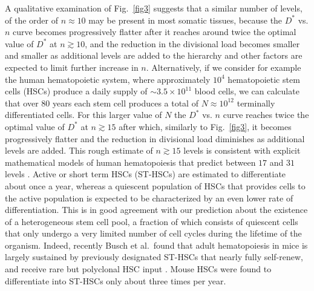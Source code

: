 \documentclass[aps,singlecolumn]{revtex4-1}
\begin{document}
A qualitative examination of
Fig.~\ref{fig3} suggests that a similar number of levels, of the order
of $n\approx10$ may be present in most somatic tissues, because the
$D^*$ vs. $n$ curve becomes progressively flatter after it reaches
around twice the optimal value of $D^*$ at $n\gtrsim10$, and the reduction
in the divisional load becomes smaller and smaller as additional
levels are added to the hierarchy
and other factors are expected to limit further increase in $n$.
Alternatively, if we consider for example the human hematopoietic
system, where approximately $10^4$ hematopoietic stem cells (HSCs)
produce a daily supply of
$\sim3.5\times10^{11}$ blood cells, we can calculate that over
$80$ years each stem cell produces a total of $N\approx10^{12}$
terminally differentiated cells. For this larger value of $N$ the
$D^*$ vs. $n$ curve reaches twice the optimal value of
$D^*$ at $n\gtrsim15$ after which, similarly to Fig.~\ref{fig3}, it
becomes progressively flatter and the reduction in divisional load
diminishes as additional levels are added. This rough estimate of
$n\gtrsim15$ levels is consistent with explicit mathematical models of
human hematopoiesis that predict between $17$ and $31$ levels
\cite{Dingli:2007}.
Active or short term HSCs (ST-HSCs) are estimated to differentiate about
once a year, whereas a quiescent population of HSCs that provides cells
to the active population is expected to be characterized by an even
lower rate of differentiation. This is in good agreement with our
prediction about the existence of a heterogeneous stem cell pool,
a fraction of which consists of quiescent cells that only undergo a
very limited number of cell cycles during the lifetime of the organism.
Indeed, recently Busch et al.\ found that adult
hematopoiesis in mice is largely sustained by
previously designated ST-HSCs that nearly fully
self-renew, and receive rare but polyclonal HSC input
\cite{Busch:2015}. Mouse HSCs were found to differentiate into ST-HSCs only about
three times per year.
\end{document}
